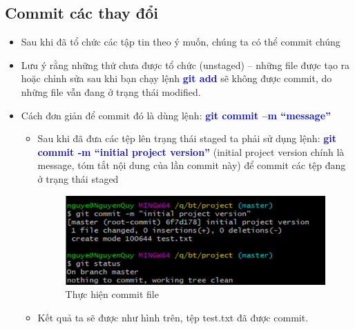 \documentclass[12pt,a4paper]{report}
\begin{document}
\subsection{Commit các thay đổi}
\begin{itemize}
\item Sau khi đã tổ chức các tập tin theo ý muốn, chúng ta có thể commit chúng
\item Lưu ý rằng những thứ chưa được tổ chức (unstaged) – những file được tạo ra hoặc chỉnh sửa sau khi bạn chạy lệnh \textcolor{blue}{\bf git add} sẽ không được commit, do những file vẫn đang ở trạng thái modified.
\item Cách đơn giản để commit đó là dùng lệnh: \textcolor{blue}{\bf git commit –m “message”}
	\begin{itemize}
	\item Sau khi đã đưa các tệp lên trạng thái staged ta phải sử dụng lệnh: \textcolor{blue}{\bf git commit -m “initial project version”} (initial project version chính là message, tóm tắt nội dung của lần commit này) để commit các tệp đang ở trạng thái staged

\begin{figure}[!ht]
	\centering
	\includegraphics[width=0.8\linewidth]{screenshot012}
\caption{Thực hiện commit file}
	\label{fig:screenshot012}
\end{figure}
	\item Kết quả ta sẽ được như hình trên, tệp test.txt đã được commit.
\end{itemize}
\end{itemize}
\end{document}
